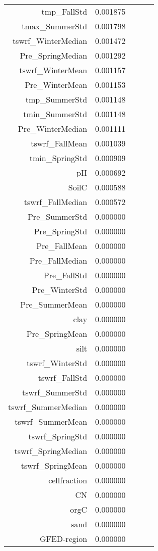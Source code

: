 \begin{tabular}{rrrrr}
tmp_FallStd & 0.001875 \\
tmax_SummerStd & 0.001798 \\
tswrf_WinterMedian & 0.001472 \\
Pre_SpringMedian & 0.001292 \\
tswrf_WinterMean & 0.001157 \\
Pre_WinterMean & 0.001153 \\
tmp_SummerStd & 0.001148 \\
tmin_SummerStd & 0.001148 \\
Pre_WinterMedian & 0.001111 \\
tswrf_FallMean & 0.001039 \\
tmin_SpringStd & 0.000909 \\
pH & 0.000692 \\
SoilC & 0.000588 \\
tswrf_FallMedian & 0.000572 \\
Pre_SummerStd & 0.000000 \\
Pre_SpringStd & 0.000000 \\
Pre_FallMean & 0.000000 \\
Pre_FallMedian & 0.000000 \\
Pre_FallStd & 0.000000 \\
Pre_WinterStd & 0.000000 \\
Pre_SummerMean & 0.000000 \\
clay & 0.000000 \\
Pre_SpringMean & 0.000000 \\
silt & 0.000000 \\
tswrf_WinterStd & 0.000000 \\
tswrf_FallStd & 0.000000 \\
tswrf_SummerStd & 0.000000 \\
tswrf_SummerMedian & 0.000000 \\
tswrf_SummerMean & 0.000000 \\
tswrf_SpringStd & 0.000000 \\
tswrf_SpringMedian & 0.000000 \\
tswrf_SpringMean & 0.000000 \\
cellfraction & 0.000000 \\
CN & 0.000000 \\
orgC & 0.000000 \\
sand & 0.000000 \\
GFED-region & 0.000000 \\
\bottomrule
\end{tabular}
